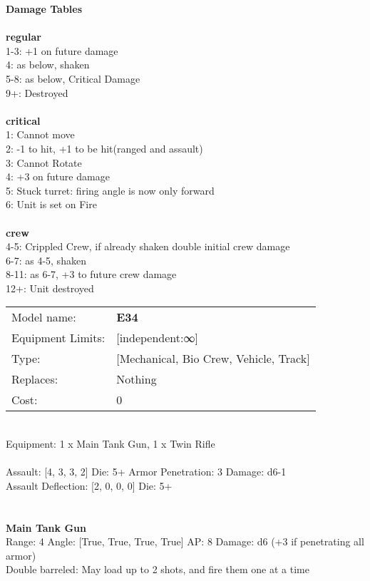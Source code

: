 {\bf Damage Tables} \\
\ \\ {\bf regular } \\
1-3: +1 on future damage \\
4: as below, shaken \\
5-8: as below, Critical Damage \\
9+: Destroyed \\
\ \\ {\bf critical } \\
1: Cannot move \\
2: -1 to hit, +1 to be hit(ranged and assault) \\
3: Cannot Rotate \\
4: +3 on future damage \\
5: Stuck turret: firing angle is now only forward \\
6: Unit is set on Fire \\
\ \\ {\bf crew } \\
4-5: Crippled Crew, if already shaken double initial crew damage \\
6-7: as 4-5, shaken \\
8-11: as 6-7, +3 to future crew damage \\
12+: Unit destroyed \\


\noindent
\begin{tabular}{ll}
Model name: &{\bf E34 } \\
Equipment Limits: &[independent:∞] \\
Type: &[Mechanical, Bio Crew, Vehicle, Track] \\
Replaces: &Nothing \\
Cost: & 0\\
\end{tabular}
\ \\
Equipment: 1 x Main Tank Gun, 1 x Twin Rifle \\
\ \\
Assault: [4, 3, 3, 2] Die: 5+ Armor Penetration: 3 Damage: d6-1 \\
Assault Deflection: [2, 0, 0, 0] Die: 5+\\
\indent  
\ \\

\ \\
{\bf Main Tank Gun } \\



Range: 4  Angle: [True, True, True, True] AP: 8 Damage: d6 (+3 if penetrating all armor) \\
Double barreled: May load up to 2 shots, and fire them one at a time\\ 




